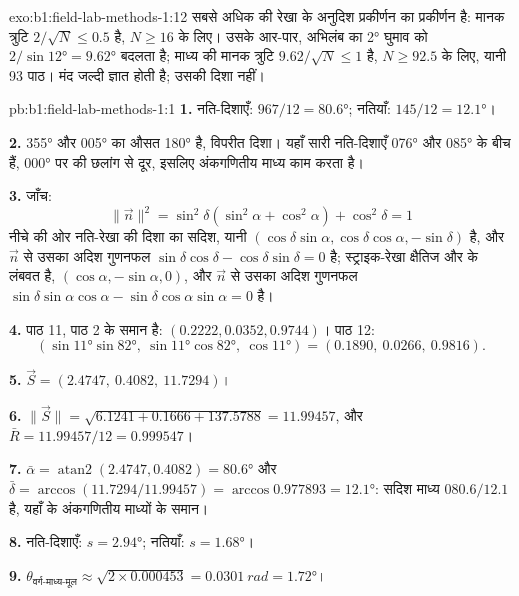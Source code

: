 \begin{solution}{exo:b1:field-lab-methods-1:12}
सबसे अधिक  की रेखा के अनुदिश प्रकीर्णन  का प्रकीर्णन है: मानक त्रुटि $2/\sqrt N \le 0.5$ है, $N \ge 16$ के लिए।
उसके आर-पार, अभिलंब का \ang{2} घुमाव  को $2/\sin\ang{12} = \ang{9.62}$ बदलता है; माध्य  की मानक
त्रुटि $9.62/\sqrt N \le 1$ है, $N \ge 92.5$ के लिए, यानी 93 पाठ। मंद  जल्दी ज्ञात होती है; उसकी दिशा नहीं।
\end{solution}

\begin{solution}{pb:b1:field-lab-methods-1:1}
\textbf{1.} नति-दिशाएँ: $967/12 = \ang{80.6}$; नतियाँ: $145/12 =
\ang{12.1}$।

\textbf{2.} \ang{355} और \ang{005} का औसत \ang{180} है, विपरीत दिशा। यहाँ सारी नति-दिशाएँ \ang{076} और \ang{085} के बीच हैं,
\ang{000} पर की छलांग से दूर, इसलिए अंकगणितीय माध्य काम करता है।

\textbf{3.} जाँच:
\[ \|\vec n\|^2 = \sin^2\delta(\sin^2\alpha + \cos^2\alpha) + \cos^2\delta = 1 \]
नीचे की ओर नति-रेखा की दिशा का सदिश, यानी
$(\cos\delta\sin\alpha, \cos\delta\cos\alpha, -\sin\delta)$ है, और $\vec n$ से उसका अदिश गुणनफल
$\sin\delta\cos\delta - \cos\delta\sin\delta = 0$ है; स्ट्राइक-रेखा क्षैतिज और  के लंबवत है,
$(\cos\alpha, -\sin\alpha, 0)$, और $\vec n$ से उसका अदिश गुणनफल
$\sin\delta\sin\alpha\cos\alpha - \sin\delta\cos\alpha\sin\alpha = 0$ है।

\textbf{4.} पाठ 11, पाठ 2 के समान है: $(0.2222, 0.0352, 0.9744)$। पाठ 12:
\[
  (\sin\ang{11}\sin\ang{82},\ \sin\ang{11}\cos\ang{82},\ \cos\ang{11}) =
  (0.1890,\ 0.0266,\ 0.9816).
\]

\textbf{5.} $\vec S = (2.4747,\ 0.4082,\ 11.7294)$।

\textbf{6.} $\|\vec S\| = \sqrt{6.1241 + 0.1666 + 137.5788} = 11.99457$, और
$\bar R = 11.99457/12 = 0.999547$।

\textbf{7.} $\bar\alpha = \operatorname{atan2}(2.4747, 0.4082) = \ang{80.6}$
और $\bar\delta = \arccos(11.7294/11.99457) = \arccos 0.977893 = \ang{12.1}$:
सदिश माध्य $080.6/12.1$ है, यहाँ के अंकगणितीय माध्यों के समान।

\textbf{8.} नति-दिशाएँ: $s = \ang{2.94}$; नतियाँ: $s = \ang{1.68}$।

\textbf{9.} $\theta_{\text{वर्ग-माध्य-मूल}} \approx \sqrt{2\times0.000453} =
\qty{0.0301}{rad} = \ang{1.72}$।


\end{solution}
